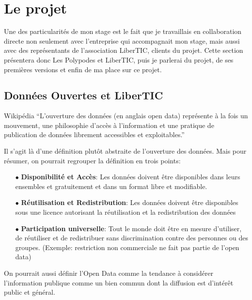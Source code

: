 \section{Le projet}

Une des particularités de mon stage est le fait que je travaillais en collaboration directe non seulement avec l'entreprise qui accompagnait mon stage, mais aussi avec des représentants de l'association LiberTIC, clients du projet. Cette section présentera donc Les Polypodes et LiberTIC, puis je parlerai du projet, de ses premières versions et enfin de ma place sur ce projet.

\subsection{Données Ouvertes et LiberTIC}

\begin{aquote}{Wikipédia}
``L'ouverture des données (en anglais open data) représente à la fois un mouvement, une philosophie d'accès à l'information et une pratique de publication de données librement accessibles et exploitables.''
\end{aquote}

Il s'agit là d'une définition plutôt abstraite de l'ouverture des données. Mais pour résumer, on pourrait regrouper la définition en trois points:

\begin{itemize}
    \item[$\bullet$] \textbf{Disponibilité et Accès}: Les données doivent être disponibles dans leurs ensembles et gratuitement et dans un format libre et modifiable.
    \item[$\bullet$] \textbf{Réutilisation et Redistribution}: Les données doivent être disponibles sous une licence autorisant la réutilisation et la redistribution des données
    \item[$\bullet$] \textbf{Participation universelle}: Tout le monde doit être en mesure d'utiliser, de réutiliser et de redistribuer sans discrimination contre des personnes ou des groupes. (Exemple: restriction non commerciale ne fait pas partie de l'open data)
\end{itemize}

On pourrait aussi définir l'Open Data comme la tendance à considérer l'information publique comme un bien commun dont la diffusion est d'intérêt public et général.

\vspace{1cm}

